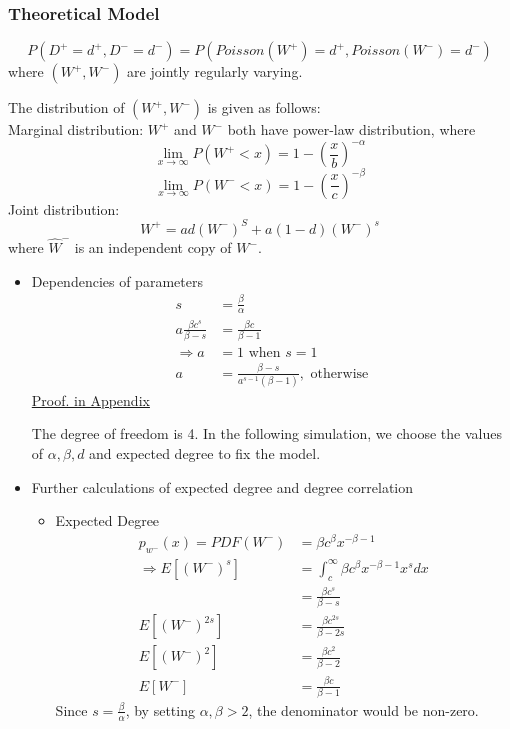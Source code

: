 \documentclass{article}
\begin{document}
		\subsubsection{Theoretical Model}
$$P(D^+ = d^+, D^- = d^-) = P(Poisson(W^+) = d^+, Poisson(W^-)=d^-)$$
where $(W^+,W^-)$  are jointly regularly varying. 
\par The distribution of $(W^+,W^-)$ is given as follows: \\ 
Marginal distribution:
		$W^+$ and $W^-$ both have power-law distribution, where
$$\lim_{x \rightarrow \infty}  P(W^+ < x) =1-(\frac{x}{b})^{-\alpha}$$
$$\lim_{x \rightarrow \infty}  P(W^- < x) = 1-(\frac{x}{c})^{- \beta} $$
Joint distribution:
$$ W^+ = ad(W^-)^S+a(1-d)(W^-)^s$$
where  $\hat{W}^-$ is an independent copy of $W^-$.
\\
\begin{itemize}
\item Dependencies of parameters\\
\begin{align*}
s &= \frac{\beta}{\alpha}\\
a\frac{\beta c^s}{\beta -s}&=\frac{\beta c}{\beta -1}\\
\Rightarrow 
 a &= 1 \text{ when } s=1 \\
a&=\frac{\beta - s}{a^{s-1}(\beta-1)}, \text{ otherwise}
\end{align*}
\hyperlink{pf_of_dependency}{Proof. in Appendix}

\par The degree of freedom is 4. In the following simulation, we choose the values of $\alpha, \beta, d$ and expected degree to fix the model.

\item Further calculations of expected degree and degree correlation\\
	\begin{itemize}
		\item Expected Degree
		\begin{align*}
p_{w^-}(x)=PDF(W^-) &= \beta c^\beta x^{-\beta - 1}\\
\Rightarrow
E[(W^-)^s]&=\int_c ^\infty \beta c^\beta x^{-\beta - 1}x^sdx
\\ &=\frac{\beta c^s}{\beta -s}\\
E[(W^-)^{2s}]&=\frac{\beta c^{2s}}{\beta -2s}\\
E[(W^-)^2]&=\frac{\beta c^2}{\beta -2}\\
E[W^-]&=\frac{\beta c}{\beta -1}
\end{align*}
Since $s=\frac{\beta}{\alpha}$, by setting $\alpha, \beta > 2$, the denominator would be non-zero.
	

\end{itemize}
\end{itemize}
\end{document}
